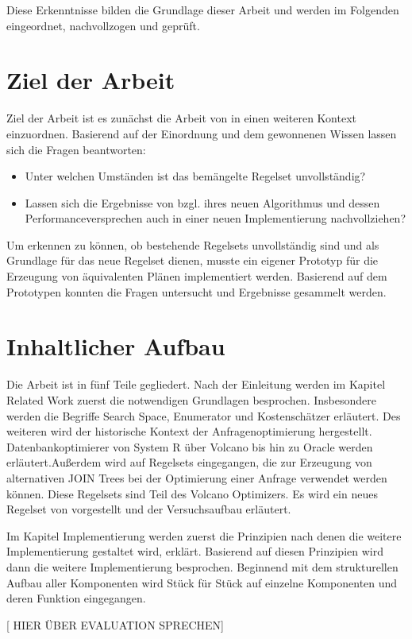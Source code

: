 Diese Erkenntnisse bilden die Grundlage dieser Arbeit und werden im Folgenden eingeordnet, nachvollzogen und geprüft.

\section{Ziel der Arbeit}

Ziel der Arbeit ist es zunächst die Arbeit von \cite{shanbhag2014optimizing} in einen weiteren Kontext einzuordnen. Basierend auf der Einordnung und dem gewonnenen Wissen lassen sich die Fragen beantworten:

\begin{itemize}
\item Unter welchen Umständen ist das bemängelte Regelset unvollständig? 
\item Lassen sich die Ergebnisse von \cite{shanbhag2014optimizing} bzgl. ihres neuen Algorithmus und dessen Performanceversprechen auch in einer neuen Implementierung nachvollziehen?
\end{itemize}

Um erkennen zu können, ob bestehende Regelsets unvollständig sind und als Grundlage für das neue Regelset dienen,  musste ein eigener Prototyp für die Erzeugung von äquivalenten Plänen implementiert werden. Basierend auf dem Prototypen konnten die Fragen untersucht und Ergebnisse gesammelt werden.







\section{Inhaltlicher Aufbau}
Die Arbeit ist in fünf Teile gegliedert. Nach der Einleitung werden im Kapitel Related Work zuerst die notwendigen Grundlagen besprochen. Insbesondere werden die Begriffe Search Space, Enumerator und Kostenschätzer erläutert. Des weiteren wird der historische Kontext der Anfragenoptimierung hergestellt. Datenbankoptimierer von System R über Volcano bis hin zu Oracle werden erläutert.Außerdem wird auf Regelsets eingegangen, die zur Erzeugung von alternativen JOIN Trees bei der Optimierung einer Anfrage verwendet werden können. Diese Regelsets sind Teil des Volcano Optimizers. Es wird ein neues Regelset von \cite{shanbhag2014optimizing} vorgestellt und der Versuchsaufbau erläutert. 

Im Kapitel Implementierung werden zuerst  die Prinzipien nach denen die weitere Implementierung gestaltet wird, erklärt. Basierend auf diesen Prinzipien wird dann die weitere Implementierung besprochen. Beginnend mit dem strukturellen Aufbau aller Komponenten wird Stück für Stück auf einzelne Komponenten und deren Funktion eingegangen.

[ HIER ÜBER EVALUATION SPRECHEN]



 